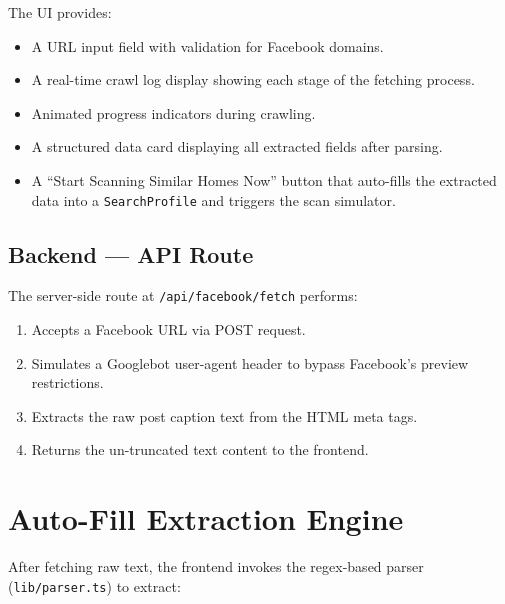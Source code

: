 \documentclass[12pt, a4paper, oneside]{report}
\newcommand{\filepath}[1]{\texttt{\small\color{codeblue}#1}}
\newcommand{\apiendpoint}[1]{\texttt{\small\color{primary}#1}}
\newcommand{\typename}[1]{\texttt{\small\color{codeblue}#1}}
\begin{document}
The UI provides:

\begin{itemize}[leftmargin=2em]
  \item A URL input field with validation for Facebook domains.
  \item A real-time crawl log display showing each stage of the fetching process.
  \item Animated progress indicators during crawling.
  \item A structured data card displaying all extracted fields after parsing.
  \item A ``Start Scanning Similar Homes Now'' button that auto-fills the extracted data into a \typename{SearchProfile} and triggers the scan simulator.
\end{itemize}

\subsection{Backend --- API Route}

The server-side route at \apiendpoint{/api/facebook/fetch} performs:

\begin{enumerate}[leftmargin=2em]
  \item Accepts a Facebook URL via POST request.
  \item Simulates a Googlebot user-agent header to bypass Facebook's preview restrictions.
  \item Extracts the raw post caption text from the HTML meta tags.
  \item Returns the un-truncated text content to the frontend.
\end{enumerate}

\section{Auto-Fill Extraction Engine}

After fetching raw text, the frontend invokes the regex-based parser (\filepath{lib/parser.ts}) to extract:
\end{document}
